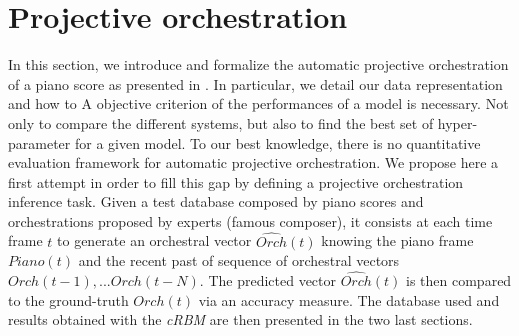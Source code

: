 \documentclass[letterpaper]{article}
\begin{document}
\section{Projective orchestration}
In this section, we introduce and formalize the automatic projective orchestration of a piano score as presented in . In particular, we detail our data representation and how to 
A objective criterion of the performances of a model is necessary. Not only to compare the different systems, but also to find the best set of hyper-parameter for a given model. To our best knowledge, there is no quantitative evaluation framework for automatic projective orchestration. We propose here a first attempt in order to fill this gap by defining a projective orchestration inference task. Given a test database composed by piano scores and orchestrations proposed by experts (famous composer), it consists at each time frame $t$ to generate an orchestral vector $\hat{Orch}(t)$ knowing the piano frame $Piano(t)$ and the recent past of sequence of orchestral vectors $Orch(t-1),... Orch(t-N)$. The predicted vector $\hat{Orch}(t)$ is then compared to the ground-truth $Orch(t)$ via an accuracy measure.
The database used and results obtained with the \textit{cRBM} are then presented in the two last sections.
\end{document}
